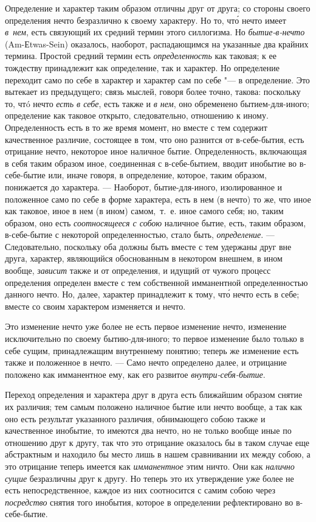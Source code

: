 Определение и характер таким образом отличны друг от друга; со стороны
своего определения нечто безразлично к своему характеру. Но то, чт\'{о} нечто
имеет {\em в~нем}, есть связующий их средний термин
этого силлогизма. Но {\em бытие-в-нечто}
(Am-Еtwas-Sein) оказалось, наоборот, распадающимся на указанные два крайних
термина. Простой средний термин есть
{\em определенность} как таковая; к ее тождеству
принадлежит как определение, так и характер. Но определение переходит само
по себе в характер и характер сам по себе "--- в определение. Это вытекает из
предыдущего; связь мыслей, говоря более точно, такова: поскольку то, чтó
нечто {\em есть в себе}, есть также и
{\em в нем}, оно обременено бытием-для-иного;
определение как таковое открыто, следовательно, отношению к иному.
Определенность есть в то же время момент, но вместе с тем содержит
качественное различие, состоящее в том, что оно разнится от в-себе-бытия,
есть отрицание нечто, некоторое иное наличное бытие. Определенность,
включающая в себя таким образом иное, соединенная с в-себе-бытием, вводит
инобытие во в-себе-бытие или, иначе говоря, в определение, которое, таким
образом, понижается до характера. --- Наоборот, бытие-для-иного,
изолированное и положенное само по себе в форме характера, есть в нем (в
нечто) то же, что иное как таковое, иное в нем (в ином) самом,~т.~е.
иное самого себя; но, таким образом, оно есть
{\em соотносящееся с собою} наличное бытие, есть, таким
образом, в-себе-бытие с некоторой определенностью, стало быть,
{\em определение}. --- Следовательно, поскольку оба
должны быть вместе с тем удержаны друг вне друга, характер, являющийся
обоснованным в некотором внешнем, в ином вообще,
{\em зависит} также и от определения, и идущий от
чужого процесс определения определен вместе с тем собственной имманентной
определенностью данного нечто. Но, далее, характер принадлежит к тому, чт\'{о}
нечто есть в себе; вместе со своим характером изменяется и нечто.

Это изменение нечто уже более не есть первое изменение нечто, изменение
исключительно по своему бытию-для-иного; то первое изменение было только
в себе сущим, принадлежащим внутреннему понятию; теперь же изменение есть
также и положенное в нечто. --- Само нечто определено далее, и отрицание
положено как имманентное ему, как его развитое
{\em внутри-себя-бытие}.

Переход определения и характера друг в друга есть ближайшим образом снятие
их различия; тем самым положено наличное бытие или нечто вообще, а так как
оно есть результат указанного различия, обнимающего собою также и
качественное инобытие, то имеются два нечто, но не только вообще иные по
отношению друг к другу, так что это отрицание оказалось бы в таком случае
еще абстрактным и находило бы место лишь в нашем сравнивании их между
собою, а это отрицание теперь имеется как
{\em имманентное} этим ничто. Они как
{\em налично сущие} безразличны друг к другу. Но теперь
это их утверждение уже более не есть непосредственное, каждое из них
соотносится с самим собою через {\em посредство} снятия
того инобытия, которое в определении рефлектировано во в-себе-бытие.

